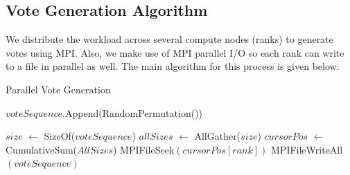 \documentclass[final,5p,times,twocolumn,authoryear, 10pt]{elsarticle}
\begin{document}
\subsection{Vote Generation Algorithm}
\label{Vote Generation Algorithm}
We distribute the workload across several compute nodes (ranks) to generate
votes using MPI. Also, we make use of MPI parallel I/O so each rank can write
to a file in parallel as well. The main algorithm for this process is given
below:
\begin{algorithm}[H]
    \caption{Parallel Vote Generation}\label{alg:cap}
    \begin{algorithmic}[1]
        \State $voteSequence$.Append(RandomPermutation())
    \EndFor

    \State $size$ $\gets$ SizeOf($voteSequence$)
    \State $allSizes$ $\gets$ AllGather($size$) 
    \State $cursorPos$ $\gets$ CumulativeSum($AllSizes$)
    \State MPIFileSeek$(cursorPos[rank])$
    \State MPIFileWriteAll$(voteSequence)$
    \EndProcedure
    \end{algorithmic}
\end{algorithm}
\end{document}

